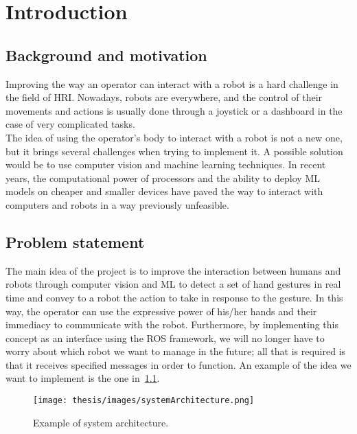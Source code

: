 \documentclass[../thesis.tex]{subfiles}
\begin{document}
\chapter{Introduction}\label{cap:introduction}

\section{Background and motivation}
Improving the way an operator can interact with a robot is a hard challenge in the field of \acrfull{HRI}. Nowadays, robots are everywhere, and the control of their movements and actions is usually done through a joystick or a dashboard in the case of very complicated tasks.\\
The idea of using the operator's body to interact with a robot is not a new one, but it brings several challenges when trying to implement it. A possible solution would be to use computer vision and machine learning techniques. In recent years, the computational power of processors and the ability to deploy \acrfull{ML} models on cheaper and smaller devices have paved the way to interact with computers and robots in a way previously unfeasible.

\section{Problem statement}
The main idea of the project is to improve the interaction between humans and robots through computer vision and \acrshort{ML} to detect a set of hand gestures in real time and convey to a robot the action to take in response to the gesture. In this way, the operator can use the expressive power of his/her hands and their immediacy to communicate with the robot. Furthermore, by implementing this concept as an interface using the \acrfull{ROS} framework, we will no longer have to worry about which robot we want to manage in the future; all that is required is that it receives specified messages in order to function. An example of the idea we want to implement is the one in~\ref{fig:systemArchitecture}.

\begin{figure}[H]
  \centering
  \texttt{[image: thesis/images/systemArchitecture.png]}
  \caption{Example of system architecture.}
  \label{fig:systemArchitecture}
\end{figure}
\end{document}
